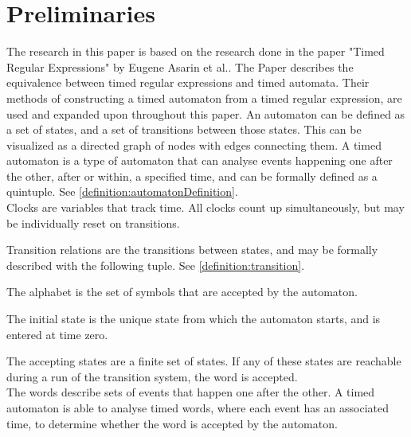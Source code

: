 \section{Preliminaries}






The research in this paper is based on the research done in the paper "Timed Regular Expressions" by Eugene Asarin et al.\cite{Eugene2001}. The Paper describes the equivalence between timed regular expressions and timed automata. Their methods of constructing a timed automaton from a timed regular expression, are used and expanded upon throughout this paper.
An automaton can be defined as a set of states, and a set of transitions between those states. This can be visualized as a directed graph of nodes with edges connecting them.
A timed automaton is a type of automaton that can analyse events happening one after the other, after or within, a specified time, and can be formally defined as a quintuple\cite{ALUR1994}. See \cref{definition:automatonDefinition}.
\\

Clocks are variables that track time. All clocks count up simultaneously, but may be individually reset on transitions.

Transition relations are the transitions between states, and may be formally described with the following tuple. See \cref{definition:transition}.

The alphabet is the set of symbols that are accepted by the automaton.

The initial state is the unique state from which the automaton starts, and is entered at time zero.

The accepting states are a finite set of states. If any of these states are reachable during a run of the transition system, the word is accepted.\\

The words describe sets of events that happen one after the other. A timed automaton is able to analyse timed words, where each event has an associated time, to determine whether the word is accepted by the automaton.

